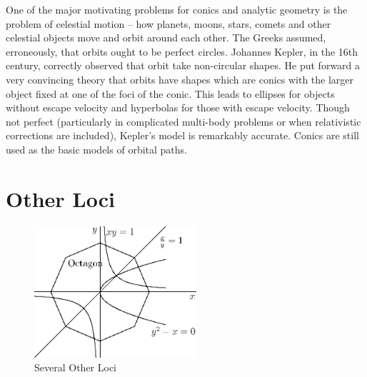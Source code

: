 \documentclass[fleqn]{report}
\begin{document}
One of the major motivating problems for conics and analytic
geometry is the problem of
celestial motion -- how planets, moons, stars, comets and other
celestial objects move and orbit around each other. The Greeks
assumed, erroneously, that orbits ought to be perfect circles.
Johannes Kepler, in the 16th century, correctly observed that
orbit take non-circular shapes. He put forward a very
convincing theory that orbits have shapes which are conics with
the larger object fixed at one of the foci of the conic. This
leads to ellipses for objects without escape velocity and
hyperbolas for those with escape velocity. Though not perfect
(particularly in complicated multi-body problems or when
relativistic corrections are included), Kepler's model is
remarkably accurate. Conics are still used as the basic
models of orbital paths.
\clearpage

\section*{Other Loci}

\begin{figure}[ht]
\centering
\includegraphics[width=6cm]{figure07.eps}
\caption{Several Other Loci}
\label{Several Other Loci}
\end{figure}
\end{document}
